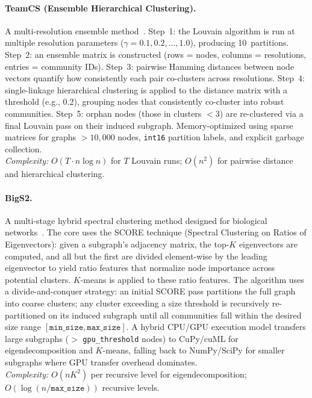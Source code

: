 \documentclass[11pt]{article}
\begin{document}
\paragraph{TeamCS (Ensemble Hierarchical Clustering).}
A multi-resolution ensemble method~\citep{choobdar_dream_2019}. Step~1: the Louvain algorithm is run at multiple resolution parameters ($\gamma = 0.1, 0.2, \ldots, 1.0$), producing 10~partitions. Step~2: an ensemble matrix is constructed (rows = nodes, columns = resolutions, entries = community IDs). Step~3: pairwise Hamming distances between node vectors quantify how consistently each pair co-clusters across resolutions. Step~4: single-linkage hierarchical clustering is applied to the distance matrix with a threshold (e.g., 0.2), grouping nodes that consistently co-cluster into robust communities. Step~5: orphan nodes (those in clusters $<3$) are re-clustered via a final Louvain pass on their induced subgraph. Memory-optimized using sparse matrices for graphs $>10{,}000$ nodes, \texttt{int16} partition labels, and explicit garbage collection.\\
\emph{Complexity:} $O(T \cdot n\log n)$ for $T$ Louvain runs; $O(n^2)$ for pairwise distance and hierarchical clustering.

\paragraph{BigS2.}
A multi-stage hybrid spectral clustering method designed for biological networks~\citep{choobdar_dream_2019}. The core uses the SCORE technique (Spectral Clustering on Ratios of Eigenvectors): given a subgraph's adjacency matrix, the top-$K$ eigenvectors are computed, and all but the first are divided element-wise by the leading eigenvector to yield ratio features that normalize node importance across potential clusters. $K$-means is applied to these ratio features. The algorithm uses a divide-and-conquer strategy: an initial SCORE pass partitions the full graph into coarse clusters; any cluster exceeding a size threshold is recursively re-partitioned on its induced subgraph until all communities fall within the desired size range $[\texttt{min\_size}, \texttt{max\_size}]$. A hybrid CPU/GPU execution model transfers large subgraphs ($>$ \texttt{gpu\_threshold} nodes) to CuPy/cuML for eigendecomposition and $K$-means, falling back to NumPy/SciPy for smaller subgraphs where GPU transfer overhead dominates.\\
\emph{Complexity:} $O(nK^2)$ per recursive level for eigendecomposition; $O(\log(n/\texttt{max\_size}))$ recursive levels.
\end{document}
